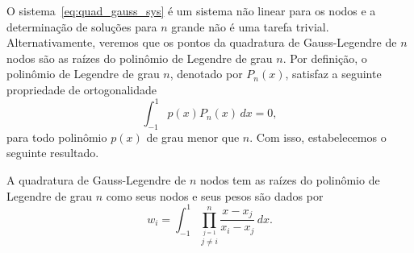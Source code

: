 O sistema~\eqref{eq:quad_gauss_sys} é um sistema não linear para os nodos e a determinação de soluções para $n$ grande não é uma tarefa trivial. Alternativamente, veremos que os pontos da quadratura de Gauss-Legendre de $n$ nodos são as raízes do polinômio de Legendre de grau $n$. Por definição, o polinômio de Legendre de grau $n$, denotado por $P_n(x)$, satisfaz a seguinte propriedade de ortogonalidade
\begin{equation}\label{eq:ortogonalidade_pol_Legendre}
  \int_{-1}^1 p(x)P_n(x)\,dx = 0,
\end{equation}
para todo polinômio $p(x)$ de grau menor que $n$. Com isso, estabelecemos o seguinte resultado.

\begin{teo}\label{teo:Gauss-Legendre}
  A quadratura de Gauss-Legendre de $n$ nodos tem as raízes do polinômio de Legendre de grau $n$ como seus nodos e seus pesos são dados por
  \begin{equation}\label{eq:pesos_Gauss-Legendre_1}
    w_i = \int_{-1}^1 \prod_{\overset{j=1}{j\neq i}}^n \frac{x-x_j}{x_i-x_j}\,dx.
  \end{equation}
\end{teo}
